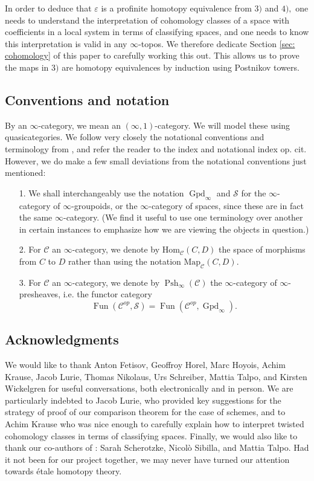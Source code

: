 \documentclass[12pt]{amsart}
\theoremstyle{definition}
\newcommand{\cS}{\mathcal{S}}
\newcommand{\sC}{\mathscr{C}}
\newcommand{\Hom}{\mathrm{Hom}}
\renewcommand{\i}{\infty}
\def\iGpd{\operatorname{Gpd}_\i}
\def\Fun{\operatorname{Fun}}
\def\Pshi{\operatorname{Psh}_\i}
\begin{document}
In order to deduce that $\varepsilon$ is a profinite homotopy equivalence from $3)$ and $4),$ one needs to understand the interpretation of cohomology classes of a space with coefficients in a local system in terms of classifying spaces, and one needs to know this interpretation is valid in any $\i$-topos. We therefore dedicate Section \ref{sec: cohomology} of this paper to carefully working this out. This allows us to prove the maps in $3)$ are homotopy equivalences by induction using Postnikov towers.

\subsection{Conventions and notation}
By an $\i$-category, we mean an $\left(\i,1\right)$-category. We will model these using quasicategories. We follow very closely the notational conventions and terminology from \cite{htt}, and refer the reader to the index and notational index op. cit. However, we do make a few small deviations from the notational conventions just mentioned:

\begin{itemize}
\item[1.] We shall interchangeably use the notation $\iGpd$ and $\cS$ for the $\i$-category of $\i$-groupoids, or the $\i$-category of spaces, since these are in fact the same $\i$-category. (We find it useful to use one terminology over another in certain instances to emphasize how we are viewing the objects in question.)
\item[2.] For $\sC$ an $\i$-category, we denote by $\Hom_{\sC}\left(C,D\right)$ the space of morphisms from $C$ to $D$ rather than using the notation $\mbox{Map}_{\sC}\left(C,D\right).$
\item[3.] For $\sC$ an $\i$-category, we denote by $\Pshi\left(\sC\right)$ the $\i$-category of $\i$-presheaves, i.e. the functor category $$\Fun\left(\sC^{op},\cS\right)=\Fun\left(\sC^{op},\iGpd\right).$$
\end{itemize}


\subsection*{Acknowledgments}
We would like to thank Anton Fetisov, Geoffroy Horel, Marc Hoyois, Achim Krause, Jacob Lurie, Thomas Nikolaus, Urs Schreiber, Mattia Talpo, and Kirsten Wickelgren for useful conversations, both electronically and in person. We are particularly indebted to Jacob Lurie, who provided key suggestions for the strategy of proof of our comparison theorem for the case of schemes, and to Achim Krause who was nice enough to carefully explain how to interpret twisted cohomology classes in terms of classifying spaces. Finally, we would also like to thank our co-authors of \cite{knhom}: Sarah Scherotzke, Nicol\`o Sibilla, and Mattia Talpo. Had it not been for our project together, we may never have turned our attention towards \'etale homotopy theory.
\end{document}

